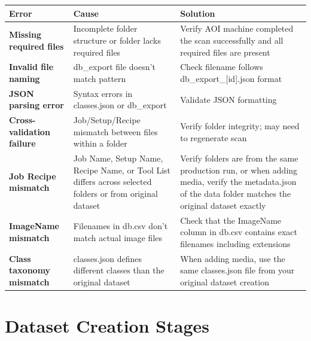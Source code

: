 \documentclass[
  11pt,
  a4paper,
  11pt,
  oneside]{report}
\renewcommand{\toprule}{\hline}
\renewcommand{\midrule}{\hline}
\renewcommand{\bottomrule}{\hline}
\begin{document}
\begin{longtable}[]{@{}
  >{\raggedright\arraybackslash}p{}
  >{\raggedright\arraybackslash}p{}
  >{\raggedright\arraybackslash}p{}@{}}
\toprule\noalign{}
\begin{minipage}[b]{\linewidth}\raggedright
\textbf{Error}
\end{minipage} & \begin{minipage}[b]{\linewidth}\raggedright
\textbf{Cause}
\end{minipage} & \begin{minipage}[b]{\linewidth}\raggedright
\textbf{Solution}
\end{minipage} \\
\midrule\noalign{}
\endhead
\bottomrule\noalign{}
\endlastfoot
\textbf{Missing required files} & Incomplete folder structure or folder
lacks required files & Verify AOI machine completed the scan
successfully and all required files are present \\
\textbf{Invalid file naming} & db\_export file doesn't match pattern &
Check filename follows db\_export\_{[}id{]}.json format \\
\textbf{JSON parsing error} & Syntax errors in classes.json or
db\_export & Validate JSON formatting \\
\textbf{Cross-validation failure} & Job/Setup/Recipe mismatch between
files within a folder & Verify folder integrity; may need to regenerate
scan \\
\textbf{Job Recipe mismatch} & Job Name, Setup Name, Recipe Name, or
Tool List differs across selected folders or from original dataset &
Verify folders are from the same production run, or when adding media,
verify the metadata.json of the data folder matches the original dataset
exactly \\
\textbf{ImageName mismatch} & Filenames in db.csv don't match actual
image files & Check that the ImageName column in db.csv contains exact
filenames including extensions \\
\textbf{Class taxonomy mismatch} & classes.json defines different
classes than the original dataset & When adding media, use the same
classes.json file from your original dataset creation \\
\end{longtable}

\chapter{Dataset Creation Stages}\label{dataset-creation-stages}
\end{document}
